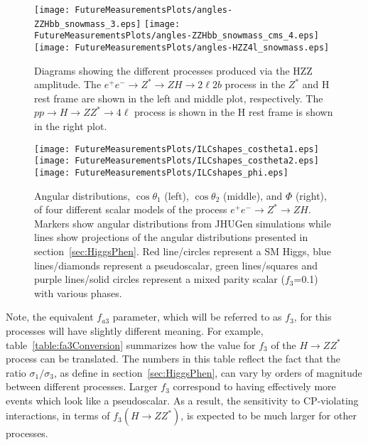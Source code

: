 \begin{figure}
\begin{center}
\texttt{[image: FutureMeasurementsPlots/angles-ZZHbb\_snowmass\_3.eps]}
\texttt{[image: FutureMeasurementsPlots/angles-ZZHbb\_snowmass\_cms\_4.eps]}
\texttt{[image: FutureMeasurementsPlots/angles-HZZ4l\_snowmass.eps]}
\caption{Diagrams showing the different processes produced
via the HZZ amplitude.  The $e^+e^-\to Z^*\to ZH\to 2\ell2b$ process
in the $Z^*$ and H rest frame are shown in the left and middle
plot, respectively.  The $pp\to H\to ZZ^*\to 4\ell$ process
is shown in the H rest frame is shown in the right plot.}
\label{fig:HZZprocesses}
\end{center}
\end{figure}

\begin{figure}
\begin{center}
\texttt{[image: FutureMeasurementsPlots/ILCshapes\_costheta1.eps]}
\texttt{[image: FutureMeasurementsPlots/ILCshapes\_costheta2.eps]}
\texttt{[image: FutureMeasurementsPlots/ILCshapes\_phi.eps]}
\caption{Angular distributions, $\cos\theta_1$ (left), 
$\cos\theta_2$ (middle), and $\Phi$ (right), of four different 
scalar models of the process $e^+e^-\to Z^*\to ZH$.  Markers
show angular distributions from JHUGen simulations while
lines show projections of the angular distributions presented
in section~\ref{sec:HiggsPhen}. Red line/circles represent a 
SM Higgs, blue lines/diamonds represent a pseudoscalar, green
lines/squares and purple lines/solid circles represent a 
mixed parity scalar ($f_3$=0.1) with various phases.}
\label{fig:ILCprojections}
\end{center}
\end{figure}

Note, the equivalent $f_{a3}$ parameter, which will be referred
to as $f_3$, for this processes will 
have slightly different meaning.  For example, 
table~\ref{table:fa3Conversion} summarizes
how the value for $f_3$ of the $H\to ZZ^*$ process can be 
translated.  The numbers in this table reflect the fact that 
the ratio $\sigma_1/\sigma_3$, as define in 
section~\ref{sec:HiggsPhen}, can vary by orders of magnitude
between different processes.  Larger $f_3$ correspond to having
effectively more events which look like a pseudoscalar.  As a 
result, the sensitivity to CP-violating interactions, in terms 
of $f_3(H\to ZZ^*)$, is expected to be much larger for other 
processes.  

